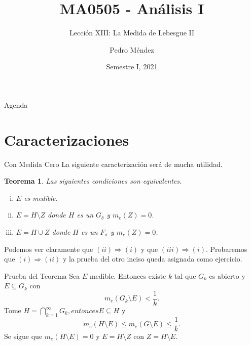 \documentclass[utf8]{beamer}
\title[MA0505]{MA0505 - An\'alisis I}
\subtitle{Lecci\'on XIII: La Medida de Lebesgue II}
\author{Pedro M\'endez\inst{1}}
\institute[Universidad de Costa Rica] %
{
  \inst{1}%
  Departmento de Matem\'atica Pura y Ciencias Actuariales\\
  Universidad de Costa Rica
  }
\date[I-2021] {Semestre I, 2021}
\theoremstyle{plain}
\newtheorem{Th}{Teorema}               %
\theoremstyle{definition}
\theoremstyle{remark}
\numberwithin{equation}{section}
\newcommand{\dl}{\delta}                %
\newcommand{\sg}{\sigma}                %
\renewcommand{\leq}{\leqslant}          %
\newcommand{\less}{\setminus}           %
\newcommand{\To}{\Rightarrow}
\newcommand{\suck}{_{k=1}^\infty} %
\renewcommand{\.}{\Cdot}                %
\begin{document}
\begin{frame}
  \titlepage
\end{frame}

\begin{frame}{Agenda}
  \tableofcontents
\end{frame}





\section{Caracterizaciones}

\begin{frame}{Con Medida Cero}
  La siguiente caracterización será de mucha utilidad.
  \begin{Th}\label{th:caracMedibles}
    Las siguientes condiciones son equivalentes.
    \begin{enumerate}[(i)]
      \item $E$ es medible.
      \item $E=H\less Z$ donde $H$ es un $G_\dl$ y $m_e(Z)=0$.
      \item $E=H\cup Z$ donde $H$ es un $F_\sg$ y $m_e(Z)=0$.
    \end{enumerate}
  \end{Th}
  Podemos ver claramente que $(ii)\To (i)$ y que $(iii)\To (i)$. Probaremos que $(i)\To (ii)$ y la prueba del otro inciso queda asignada como \alert{ejercicio}.
\end{frame}

\begin{frame}{Prueba del Teorema}
  Sea $E$ medible. Entonces existe $k$ tal que $G_k$ es abierto y $E\subseteq G_k$ con 
  $$m_e(G_k\less E)<\frac1k.$$
  Tome $H=\bigcap\suck G_k, entonces E\subseteq H$ y 
  $$m_e(H\less E)\leq m_e(G\less E)\leq \frac1k.$$
  Se sigue que $m_e(H\less E)=0$ y $E=H\less Z$ con $Z=H\less E$.
\end{frame}
\end{document}
